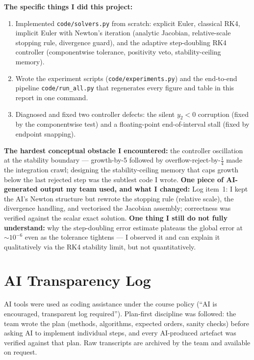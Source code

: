 ﻿\documentclass[11pt,a4paper]{article}
\begin{document}
\textbf{The specific things I did this project:}
\begin{enumerate}[leftmargin=2em,itemsep=1pt]
\item Implemented \texttt{code/solvers.py} from scratch: explicit Euler,
  classical RK4, implicit Euler with Newton's iteration (analytic Jacobian,
  relative-scale stopping rule, divergence guard), and the adaptive
  step-doubling RK4 controller (componentwise tolerance, positivity veto,
  stability-ceiling memory).
\item Wrote the experiment scripts (\texttt{code/experiments.py}) and the
  end-to-end pipeline \texttt{code/run\_all.py} that regenerates every
  figure and table in this report in one command.
\item Diagnosed and fixed two controller defects: the silent $y_2<0$
  corruption (fixed by the componentwise test) and a floating-point
  end-of-interval stall (fixed by endpoint snapping).
\end{enumerate}
\textbf{The hardest conceptual obstacle I encountered:} the controller
oscillation at the stability boundary --- growth-by-5 followed by
overflow-reject-by-$\frac14$ made the integration crawl; designing the
stability-ceiling memory that caps growth below the last rejected step was
the subtlest code I wrote.
\textbf{One piece of AI-generated output my team used, and what I changed:}
Log item~1: I kept the AI's Newton structure but rewrote the stopping rule
(relative scale), the divergence handling, and vectorised the Jacobian
assembly; correctness was verified against the scalar exact solution.
\textbf{One thing I still do not fully understand:} why the step-doubling
error estimate plateaus the global error at $\sim10^{-6}$ even as the
tolerance tightens --- I observed it and can explain it qualitatively via
the RK4 stability limit, but not quantitatively.

\section{AI Transparency Log}\label{app:ailog}
AI tools were used as coding assistance under the course policy
(``AI is encouraged, transparent log required'').  Plan-first discipline was
followed: the team wrote the plan (methods, algorithms, expected orders,
sanity checks) before asking AI to implement individual steps, and every
AI-produced artefact was verified against that plan.  Raw transcripts are
archived by the team and available on request.
\end{document}
